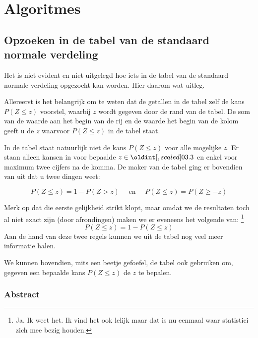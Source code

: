 \documentclass[main.tex]{subfiles}
\begin{document}
\chapter{Algoritmes}
\label{cha:algoritmes}

\section{Opzoeken in de tabel van de standaard normale verdeling}
Het is niet evident en niet uitgelegd hoe iets in de tabel van de standaard normale verdeling opgezocht kan worden. 
Hier daarom wat uitleg.

Allereerst is het belangrijk om te weten dat de getallen in de tabel zelf de kans $P(Z \le z)$ voorstel, waarbij $z$ wordt gegeven door de rand van de tabel.
De som van de waarde aan het begin van de rij en de waarde het begin van de kolom geeft u de $z$ waarvoor $P(Z \le z)$ in de tabel staat.

In de tabel staat natuurlijk niet de kans $P(Z \le z)$ voor alle mogelijke $z$.
Er staan alleen kansen in voor bepaalde $z \in \interval{0}{3.3}$ en enkel voor maximum twee cijfers na de komma.
De maker van de tabel ging er bovendien van uit dat u twee dingen weet:

\[ P(Z \le z) = 1 - P(Z > z) \quad\text{ en }\quad P(Z \le z) = P(Z \ge -z) \]

Merk op dat die eerste gelijkheid strikt klopt, maar omdat we de resultaten toch al niet exact zijn (door afrondingen) maken we er eveneens het volgende van:
\footnote{Ja. Ik weet het. Ik vind het ook lelijk maar dat is nu eenmaal waar statistici zich mee bezig houden.}
\[ P(Z \le z) = 1 - P(Z \le z) \]
Aan de hand van deze twee regels kunnen we uit de tabel nog veel meer informatie halen.

We kunnen bovendien, mits een beetje gefoefel, de tabel ook gebruiken om, gegeven een bepaalde kans $P(Z \le z)$ de $z$ te bepalen. 

\subsection{Abstract}
\end{document}
